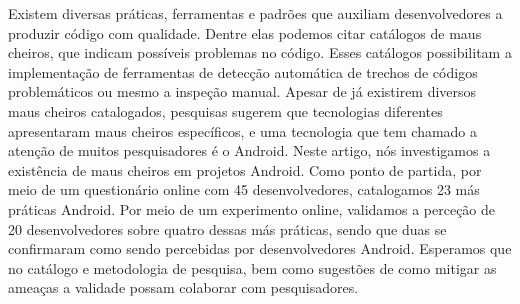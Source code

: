 Existem diversas práticas, ferramentas e padrões que auxiliam desenvolvedores a produzir código com qualidade. Dentre elas podemos citar catálogos de maus cheiros, que indicam possíveis problemas no código. Esses catálogos possibilitam a implementação de ferramentas de detecção automática de trechos de códigos problemáticos ou mesmo a inspeção manual. Apesar de já existirem diversos maus cheiros catalogados, pesquisas sugerem que tecnologias diferentes apresentaram maus cheiros específicos, e uma tecnologia que tem chamado a atenção de muitos pesquisadores é o Android. Neste artigo, nós investigamos a existência de maus cheiros em projetos Android. Como ponto de partida, por meio de um questionário online com 45 desenvolvedores, catalogamos 23 más práticas Android. Por meio de um experimento online, validamos a perceção de 20 desenvolvedores sobre quatro dessas más práticas, sendo que duas se confirmaram como sendo percebidas por desenvolvedores Android. Esperamos que no catálogo e metodologia de pesquisa, bem como sugestões de como mitigar as ameaças a validade possam colaborar com pesquisadores.


